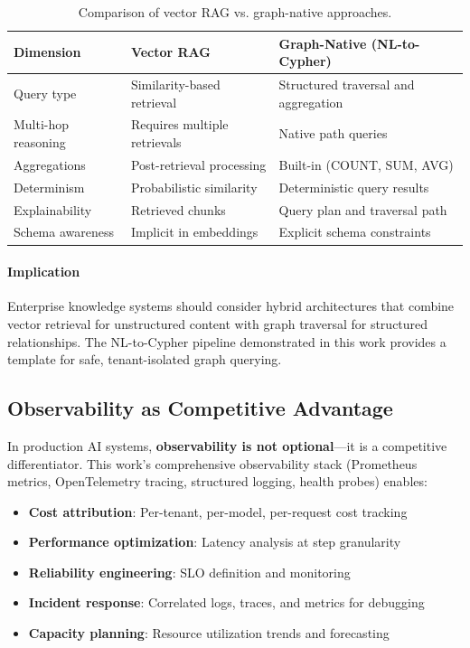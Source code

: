 \begin{table}[ht]
\centering
\caption{Comparison of vector RAG vs. graph-native approaches.}
\label{tab:rag-vs-graph}
\begin{tabular}{p{3.5cm}p{4.5cm}p{4.5cm}}
\hline
\textbf{Dimension} & \textbf{Vector RAG} & \textbf{Graph-Native (NL-to-Cypher)} \\
\hline
Query type & Similarity-based retrieval & Structured traversal and aggregation \\
Multi-hop reasoning & Requires multiple retrievals & Native path queries \\
Aggregations & Post-retrieval processing & Built-in (COUNT, SUM, AVG) \\
Determinism & Probabilistic similarity & Deterministic query results \\
Explainability & Retrieved chunks & Query plan and traversal path \\
Schema awareness & Implicit in embeddings & Explicit schema constraints \\
\hline
\end{tabular}
\end{table}

\paragraph{Implication}
Enterprise knowledge systems should consider hybrid architectures that combine vector retrieval for unstructured content with graph traversal for structured relationships. The NL-to-Cypher pipeline demonstrated in this work provides a template for safe, tenant-isolated graph querying.

\subsection{Observability as Competitive Advantage}

In production AI systems, \textbf{observability is not optional}---it is a competitive differentiator. This work's comprehensive observability stack (Prometheus metrics, OpenTelemetry tracing, structured logging, health probes) enables:

\begin{itemize}
    \item \textbf{Cost attribution}: Per-tenant, per-model, per-request cost tracking
    \item \textbf{Performance optimization}: Latency analysis at step granularity
    \item \textbf{Reliability engineering}: SLO definition and monitoring
    \item \textbf{Incident response}: Correlated logs, traces, and metrics for debugging
    \item \textbf{Capacity planning}: Resource utilization trends and forecasting
\end{itemize}

